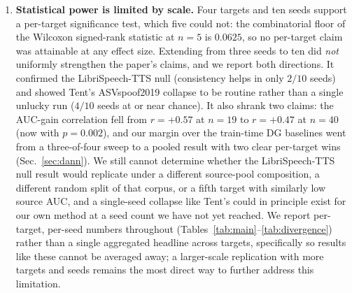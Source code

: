 \documentclass[conference]{IEEEtran}
\begin{document}
\begin{enumerate}
\item \textbf{Statistical power is limited by scale.} Four targets and ten
seeds support a per-target significance test, which five could not: the
combinatorial floor of the Wilcoxon signed-rank statistic at $n{=}5$ is
$0.0625$, so no per-target claim was attainable at any effect size. Extending
from three seeds to ten did \emph{not} uniformly strengthen the paper's claims,
and we report both directions. It confirmed the LibriSpeech-TTS null
(consistency helps in only $2/10$ seeds) and showed Tent's ASVspoof2019
collapse to be routine rather than a single unlucky run ($4/10$ seeds at or near
chance). It also shrank two claims: the AUC-gain correlation fell from
$r{=}{+}0.57$ at $n{=}19$ to $r{=}{+}0.47$ at $n{=}40$ (now with $p{=}0.002$),
and our margin over the train-time DG baselines went from a three-of-four sweep
to a pooled result with two clear per-target wins
(Sec.~\ref{sec:dann}). We still cannot determine
whether the LibriSpeech-TTS null result would replicate under a different
source-pool composition, a different random split of that corpus, or a fifth
target with similarly low source AUC, and a single-seed collapse like Tent's
could in principle exist for our own method at a seed count we have not yet
reached. We report per-target, per-seed numbers throughout
(Tables~\ref{tab:main}--\ref{tab:divergence}) rather than a single aggregated
headline across targets, specifically so results like these cannot be averaged
away; a larger-scale replication with more targets and seeds remains the most
direct way to further address this limitation.


\end{enumerate}
\end{document}
